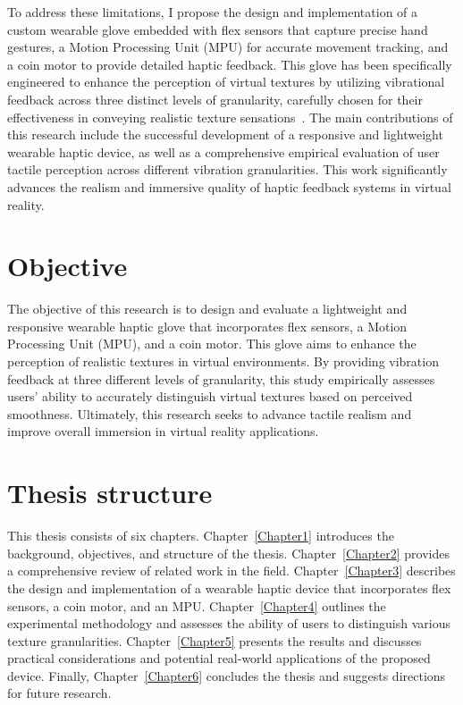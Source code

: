 To address these limitations, I propose the design and implementation of a custom wearable glove embedded with flex sensors that capture precise hand gestures, a Motion Processing Unit (MPU) for accurate movement tracking, and a coin motor to provide detailed haptic feedback. This glove has been specifically engineered to enhance the perception of virtual textures by utilizing vibrational feedback across three distinct levels of granularity, carefully chosen for their effectiveness in conveying realistic texture sensations~\cite{10.1145/3025453.3025812}. The main contributions of this research include the successful development of a responsive and lightweight wearable haptic device, as well as a comprehensive empirical evaluation of user tactile perception across different vibration granularities. This work significantly advances the realism and immersive quality of haptic feedback systems in virtual reality.


\section{Objective}

The objective of this research is to design and evaluate a lightweight and responsive wearable haptic glove that incorporates flex sensors, a Motion Processing Unit (MPU), and a coin motor. This glove aims to enhance the perception of realistic textures in virtual environments. By providing vibration feedback at three different levels of granularity, this study empirically assesses users' ability to accurately distinguish virtual textures based on perceived smoothness. Ultimately, this research seeks to advance tactile realism and improve overall immersion in virtual reality applications.

\section{Thesis structure}

This thesis consists of six chapters. Chapter~\ref{Chapter1}  introduces the background, objectives, and structure of the thesis. Chapter~\ref{Chapter2} provides a comprehensive review of related work in the field. Chapter~\ref{Chapter3} describes the design and implementation of a wearable haptic device that incorporates flex sensors, a coin motor, and an MPU. Chapter~\ref{Chapter4} outlines the experimental methodology and assesses the ability of users to distinguish various texture granularities. Chapter~\ref{Chapter5} presents the results and discusses practical considerations and potential real-world applications of the proposed device. Finally, Chapter~\ref{Chapter6} concludes the thesis and suggests directions for future research.



